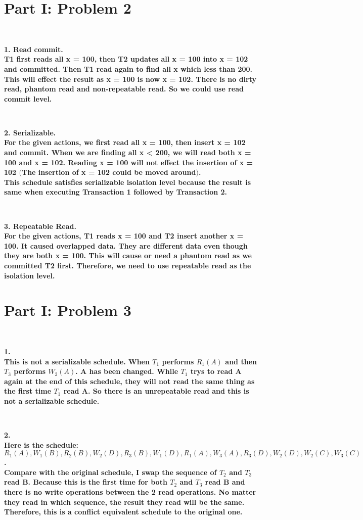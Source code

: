 \documentclass[letterpaper,11pt]{article}
\newcommand{\Paragraph}[1]{~\vspace*{-0.7\baselineskip}\\{\bf #1}}
\begin{document}
\section*{Part I: Problem 2}
\Paragraph{1. Read commit. \\
	T1 first reads all x = 100, then T2 updates all x = 100 into x = 102 and committed. Then T1 read again to find all x which less than 200. This will effect the result as 
	x = 100 is now x = 102. There is no dirty read, phantom read and non-repeatable read. So we could use read commit level. 

}
\Paragraph{2. Serializable. \\
	For the given actions, we first read all x = 100, then insert x = 102 and commit. When we are finding all x < 200, we will read both x = 100 and x = 102. 
	Reading x = 100 will not effect the insertion of x = 102 \((\)The insertion of x = 102 could be moved around\()\). \\
	This schedule satisfies serializable isolation level because the result is same when executing Transaction 1 followed by Transaction 2.

}

\Paragraph{3. Repeatable Read. \\
	For the given actions, T1 reads x = 100 and T2 insert another x = 100. It caused overlapped data. They are different data even though they are both x = 100. 
	This will cause or need a phantom read as we committed T2 first. Therefore, we need to use repeatable read as the isolation level. 

}


\section*{Part I: Problem 3}
\Paragraph{1. \\
	This is not a serializable schedule. When \(T_1\) performs \(R_1(A)\) and then \(T_3\) performs \(W_2(A)\). A has been changed. While \(T_1\) trys to read A again at 
	the end of this schedule, they will not read the same thing as the first time \(T_1\) read A. So there is an unrepeatable read and this is not a serializable schedule. 

}

\Paragraph{2. \\
	Here is the schedule: \\
	\(R_1(A), W_1(B), R_2(B), W_2(D), R_3(B), W_1(D), R_1(A), W_3(A), R_3(D), W_2(D), W_2(C), W_3(C)\). \\
	Compare with the original schedule, I swap the sequence of \(T_2\) and \(T_3\) read B. Because this is the first time for both \(T_2\) and \(T_3\) read B and there is no 
	write operations between the 2 read operations. No matter they read in which sequence, the result they read will be the same. \\
	Therefore, this is a conflict equivalent schedule to the original one. 
	

}
\end{document}
